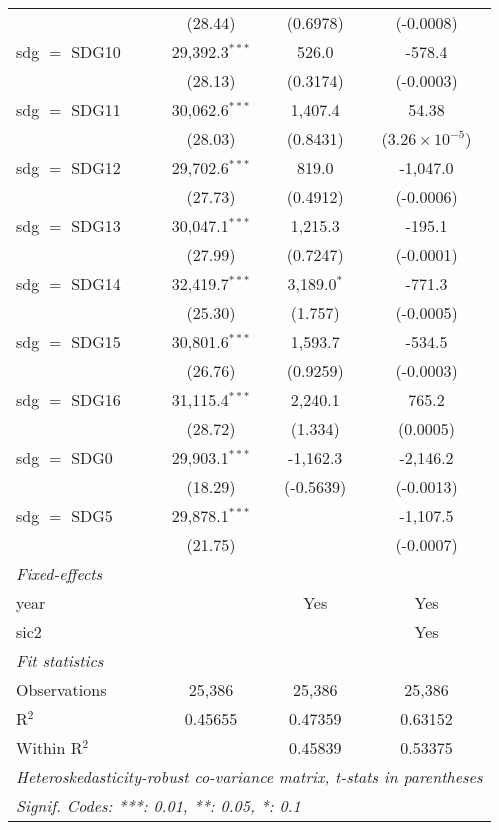 \begin{tabular}{lccc}
                 & (28.44)          & (0.6978)       & (-0.0008)\\   
   sdg $=$ SDG10 & 29,392.3$^{***}$ & 526.0          & -578.4\\   
                 & (28.13)          & (0.3174)       & (-0.0003)\\   
   sdg $=$ SDG11 & 30,062.6$^{***}$ & 1,407.4        & 54.38\\   
                 & (28.03)          & (0.8431)       & ($3.26\times 10^{-5}$)\\    
   sdg $=$ SDG12 & 29,702.6$^{***}$ & 819.0          & -1,047.0\\   
                 & (27.73)          & (0.4912)       & (-0.0006)\\   
   sdg $=$ SDG13 & 30,047.1$^{***}$ & 1,215.3        & -195.1\\   
                 & (27.99)          & (0.7247)       & (-0.0001)\\   
   sdg $=$ SDG14 & 32,419.7$^{***}$ & 3,189.0$^{*}$  & -771.3\\   
                 & (25.30)          & (1.757)        & (-0.0005)\\   
   sdg $=$ SDG15 & 30,801.6$^{***}$ & 1,593.7        & -534.5\\   
                 & (26.76)          & (0.9259)       & (-0.0003)\\   
   sdg $=$ SDG16 & 31,115.4$^{***}$ & 2,240.1        & 765.2\\   
                 & (28.72)          & (1.334)        & (0.0005)\\   
   sdg $=$ SDG0  & 29,903.1$^{***}$ & -1,162.3       & -2,146.2\\   
                 & (18.29)          & (-0.5639)      & (-0.0013)\\   
   sdg $=$ SDG5  & 29,878.1$^{***}$ &                & -1,107.5\\   
                 & (21.75)          &                & (-0.0007)\\   
   \midrule
   \emph{Fixed-effects}\\
   year          &                  & Yes            & Yes\\  
   sic2          &                  &                & Yes\\  
   \midrule
   \emph{Fit statistics}\\
   Observations  & 25,386           & 25,386         & 25,386\\  
   R$^2$         & 0.45655          & 0.47359        & 0.63152\\  
   Within R$^2$  &                  & 0.45839        & 0.53375\\  
   \midrule \midrule
   \multicolumn{4}{l}{\emph{Heteroskedasticity-robust co-variance matrix, t-stats in parentheses}}\\
   \multicolumn{4}{l}{\emph{Signif. Codes: ***: 0.01, **: 0.05, *: 0.1}}\\
\end{tabular}
\par\endgroup



